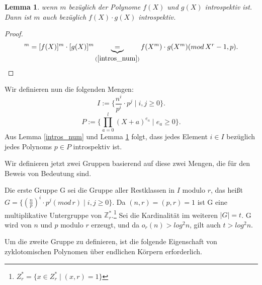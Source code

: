 \documentclass[12pt,oneside]{article}
\newtheorem{lemma}[theorem]{Lemma}
\theoremstyle{remark}
\theoremstyle{definition}
\begin{document}
\smallskip

\begin{lemma}\label{intros_pol}
wenn $m$ bezüglich der Polynome $f(X)$ und $g(X)$ introspektiv ist. Dann ist $m$ auch bezüglich $f(X) \cdot g(X)$ introspektiv.  
\end{lemma}
\begin{proof}
\begin{align*}
    [f(X) \cdot g(X)]^{m} = [f(X)]^m \cdot [g(X)]^m \underbrace{=}_{(\ref{intros_num})} f(X^m) \cdot g(X^m)(mod \, X^r - 1, p).
\end{align*}

\end{proof}

Wir definieren nun die folgenden Mengen:\newline\newline
\begin{equation}\label{I_Set}
      I := \{ \frac{n^i}{p^i} \cdot p^j \mid i,j \geq 0\}.
\end{equation}
\begin{equation}
     P := \{ \prod_{a = 0}^{l} (X + a)^{e_{a}} \mid e_{a} \geq 0 \}.
\end{equation}\label{P_Set}
\newline\newline
Aus Lemma \ref{intros_num} und Lemma \ref{intros_pol} folgt, dass jedes Element $i \in I$ bezüglich jedes Polynoms $p \in P$ introspektiv ist.\newline\newline

Wir definieren jetzt zwei Gruppen basierend auf diese zwei Mengen, die für den Beweis von Bedeutung sind.\newline\newline

Die erste Gruppe G sei die Gruppe aller Restklassen in $I$ modulo $r$, das heißt $G = \{(\frac{n}{p})^i \cdot p^j ( mod \, r) \mid i,j \geq 0 \}$. Da $(n,r) = (p,r) = 1 $ ist G eine multiplikative Untergruppe von $\mathbb{Z}_{r}^{*}$.\footnote{${Z}_{r}^{*} = \{ x \in Z_{r}^{*} \mid (x,r) =1 \}$} Sei die Kardinalität im weiteren $ | G | = t $. G wird von $n$ und $p$ modulo $r$ erzeugt, und da $o_{r}(n) > log^2 n$, gilt auch $t > log^2 n$.\newline\newline

Um die zweite Gruppe zu definieren, ist die folgende Eigenschaft von zyklotomischen Polynomen über endlichen Körpern erforderlich.
\end{document}
